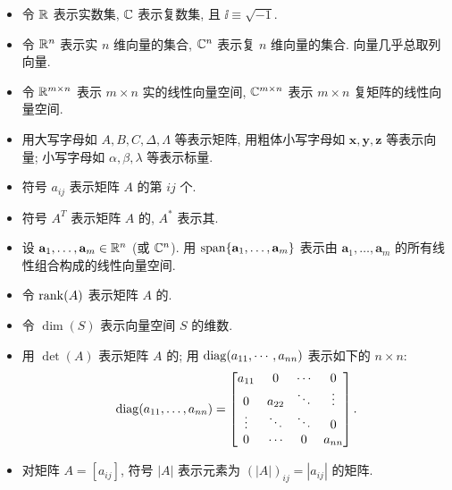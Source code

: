 \begin{itemize}
  \item 令 $\mathbb{R}$ 表示实数集, $\mathbb{C}$ 表示复数集, 且 $\ii \equiv \sqrt{-1}$.

  \item 令 $\mathbb{R}^n$ 表示实 $n$ 维向量的集合, $\mathbb{C}^n$ 表示复 $n$ 维向量的集合. 向量几乎总取列向量.

  \item 令 $\mathbb{R}^{m\times n}$ 表示 $m\times n$ 实的线性向量空间, $\mathbb{C}^{m\times n}$ 表示 $m\times n$ 复矩阵的线性向量空间.

  \item 用大写字母如 $A,B,C,\Delta,\Lambda$ 等表示矩阵, 用粗体小写字母如 $\mathbf{x},\mathbf{y},\mathbf{z}$ 等表示向量; 小写字母如 $\alpha,\beta,\lambda$ 等表示标量.

  \item 符号 $a_{ij}$ 表示矩阵 $A$ 的第 $ij$ 个.

  \item 符号 $A^T$ 表示矩阵 $A$ 的, $A^*$ 表示其.

  \item 设 $\mathbf{a}_1,\ldots,\mathbf{a}_m\in\mathbb{R}^n$ (或 $\mathbb{C}^n$). 用 $\operatorname{span}\{\mathbf{a}_1,\ldots,\mathbf{a}_m\}$ 表示由 $\mathbf{a}_1,\ldots,\mathbf{a}_m$ 的所有线性组合构成的线性向量空间.

  \item 令 $\operatorname{rank}(A)$ 表示矩阵 $A$ 的.

  \item 令 $\dim(S)$ 表示向量空间 $S$ 的维数.

  \item 用 $\det(A)$ 表示矩阵 $A$ 的; 用 $\operatorname{diag}(a_{11},\cdots,a_{nn})$ 表示如下的 $n\times n$:
  \[
    \operatorname{diag}(a_{11},\dots,a_{nn}) = \begin{bmatrix}
      a_{11} & 0      & \cdots & 0      \\
      0      & a_{22} & \ddots & \vdots \\
      \vdots & \ddots & \ddots & 0      \\
      0      & \cdots & 0      & a_{nn}
    \end{bmatrix}.
  \]

  \item 对矩阵 $A=[a_{ij}]$, 符号 $|A|$ 表示元素为 $(|A|)_{ij}=|a_{ij}|$ 的矩阵.


\end{itemize}
